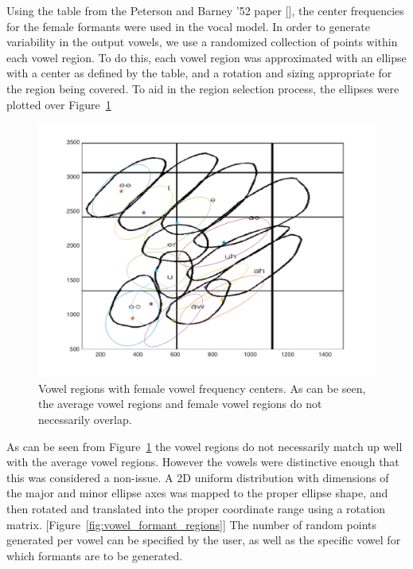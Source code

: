 \documentclass{article}
\begin{document}
Using the table from the Peterson and Barney '52 paper [\cite{peterson_barney_vowels}], the center frequencies for the female formants were used in the vocal model. In order to generate variability in the output vowels, we use a randomized collection of points within each vowel region. To do this, each vowel region was approximated with an ellipse with a center as defined by the table, and a rotation and sizing appropriate for the region being covered. To aid in the region selection process, the ellipses were plotted over Figure~\ref{fig:vowel_formants}
\begin{figure}[h]
  \centering
    \includegraphics[width=.4\textheight]{vowel_formants.png}
  \caption{Vowel regions with female vowel frequency centers. As can be seen, the average vowel regions and female vowel regions do not necessarily overlap.}
  \label{fig:vowel_formants}
\end{figure}
As can be seen from Figure~\ref{fig:vowel_formants} the vowel regions do not necessarily match up well with the average vowel regions. However the vowels were distinctive enough that this was considered a non-issue. A 2D uniform distribution with dimensions of the major and minor ellipse axes was mapped to the proper ellipse shape, and then rotated and translated into the proper coordinate range using a rotation matrix. [Figure~\ref{fig:vowel_formant_regions}] The number of random points generated per vowel can be specified by the user, as well as the specific vowel for which formants are to be generated. 
\end{document}
